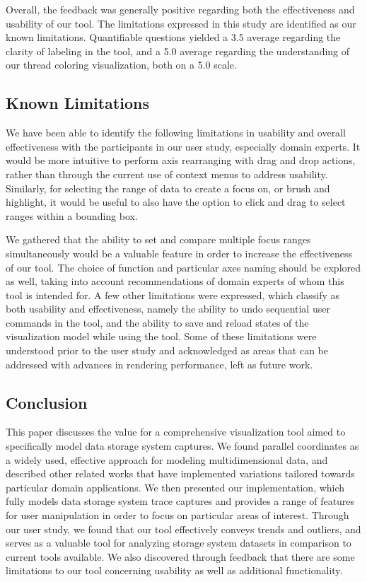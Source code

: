 \documentclass[journal]{vgtc}                %
\begin{document}
Overall, the feedback was generally positive regarding both the effectiveness and usability of our tool. The limitations expressed in this study are identified as our known limitations. Quantifiable questions yielded a 3.5 average regarding the clarity of labeling in the tool, and a 5.0 average regarding the understanding of our thread coloring visualization, both on a 5.0 scale. 

\subsection{Known Limitations}
We have been able to identify the following limitations in usability and overall effectiveness with the participants in our user study, especially domain experts. It would be more intuitive to perform axis rearranging with drag and drop actions, rather than through the current use of context menus to address usability. Similarly, for selecting the range of data to create a focus on, or brush and highlight, it would be useful to also have the option to click and drag to select ranges within a bounding box.

We gathered that the ability to set and compare multiple focus ranges simultaneously would be a valuable feature in order to increase the effectiveness of our tool. The choice of function and particular axes naming should be explored as well, taking into account recommendations of domain experts of whom this tool is intended for. A few other limitations were expressed, which classify as both usability and effectiveness, namely the ability to undo sequential user commands in the tool, and the ability to save and reload states of the visualization model while using the tool. Some of these limitations were understood prior to the user study and acknowledged as areas that can be addressed with advances in rendering performance, left as future work. 

\subsection{Conclusion}
This paper discusses the value for a comprehensive visualization tool aimed to specifically model data storage system captures. We found parallel coordinates as a widely used, effective approach for modeling multidimensional data, and described other related works that have implemented variations tailored towards particular domain applications. We then presented our implementation, which fully models data storage system trace captures and provides a range of features for user manipulation in order to focus on particular areas of interest. Through our user study, we found that our tool effectively conveys trends and outliers, and serves as a valuable tool for analyzing storage system datasets in comparison to current tools available. We also discovered through feedback that there are some limitations to our tool concerning usability as well as additional functionality.
\end{document}
